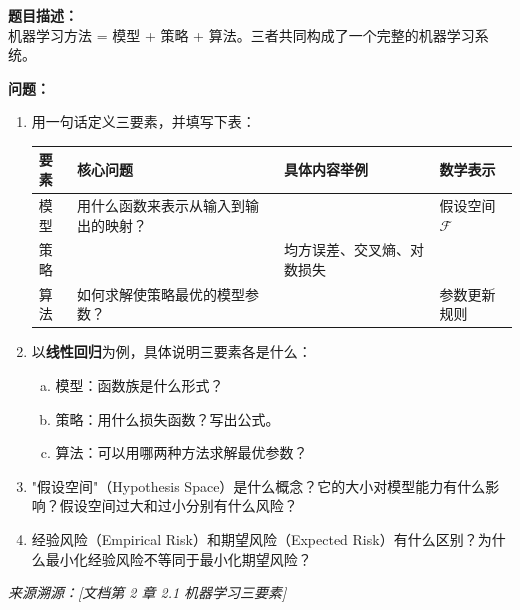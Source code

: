 \documentclass[a4paper,11pt]{ctexart}
\begin{document}
\begin{problembox}
    \textbf{题目描述：}\\
    机器学习方法 = 模型 + 策略 + 算法。三者共同构成了一个完整的机器学习系统。

    \vspace{0.3cm}
    \textbf{问题：}
    \begin{enumerate}[(1)]
        \item 用一句话定义三要素，并填写下表：

        \begin{center}
        \begin{tabular}{p{2cm} p{4cm} p{4.5cm} p{2.5cm}}
            \toprule
            要素 & 核心问题 & 具体内容举例 & 数学表示 \\
            \midrule
            模型 & 用什么函数来表示从输入到输出的映射？ & \underline{\hspace{3.5cm}} & 假设空间 $\mathcal{F}$ \\[1.5em]
            策略 & \underline{\hspace{3.5cm}} & 均方误差、交叉熵、对数损失 & \underline{\hspace{2cm}} \\[1.5em]
            算法 & 如何求解使策略最优的模型参数？ & \underline{\hspace{3.5cm}} & 参数更新规则 \\
            \bottomrule
        \end{tabular}
        \end{center}

        \item 以\textbf{线性回归}为例，具体说明三要素各是什么：
        \begin{enumerate}[a.]
            \item 模型：函数族是什么形式？
            \item 策略：用什么损失函数？写出公式。
            \item 算法：可以用哪两种方法求解最优参数？
        \end{enumerate}

        \item "假设空间"（Hypothesis Space）是什么概念？它的大小对模型能力有什么影响？假设空间过大和过小分别有什么风险？

        \item 经验风险（Empirical Risk）和期望风险（Expected Risk）有什么区别？为什么最小化经验风险不等同于最小化期望风险？
    \end{enumerate}
    {\color{gray}\small\textit{来源溯源：[文档第 2 章 2.1 机器学习三要素]}}
\end{problembox}
\end{document}
